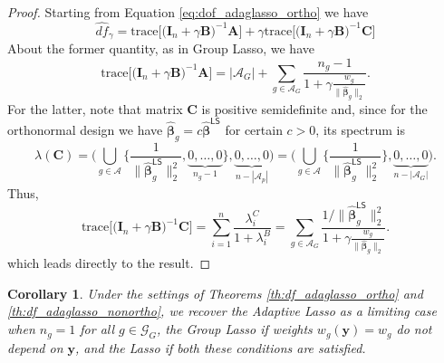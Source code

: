 \documentclass[a4paper, 12pt]{article}
\newcommand{\Aset}{\mathcal{A}}
\newcommand{\trace}{\mathrm{trace}}
\def\bbeta{\boldsymbol{\beta}}
\def\by{\boldsymbol{y}}
\def\bA{\mathbf{A}}
\def\bB{\mathbf{B}}
\def\bC{\mathbf{C}}
\def\bI{\mathbf{I}}
\def\by{\mathbf{y}}
\newtheorem{corollary}{Corollary}
\begin{document}
\begin{proof}
Starting from Equation \eqref{eq:dof_adaglasso_ortho} we have
\begin{equation*}
\widehat{df}_\gamma = \trace \big[ \big(\bI_n+\gamma \bB \big)^{-1} \bA \big] + \gamma \trace \big[\big(\bI_n+\gamma \bB \big)^{-1} \bC \big] 
\end{equation*}
About the former quantity, as in Group Lasso, we have
\begin{equation*}
\trace \big[ \big(\bI_n+\gamma \bB \big)^{-1} \bA \big] = |\Aset_G| + \sum_{g \in \Aset_G} \frac{n_g-1}{1+\gamma\frac{w_g}{\lVert \widehat{\bbeta}_g\rVert_2} }.
\end{equation*}
For the latter, note that matrix $\bC$ is positive semidefinite and, since for the orthonormal design we have $\widehat{\bbeta}_g = c \widehat{\bbeta}^\mathsf{LS}$ for certain $c>0$, its spectrum is 
\begin{equation*}
\lambda(\bC) = \bigg(\bigcup_{g \in \Aset} \bigg\{ \frac{1}{\lVert \widehat{\bbeta}_g^\mathsf{LS} \rVert_2^2}, \underbrace{0, \ldots, 0}_{n_g-1} \bigg\}, \underbrace{0, \ldots, 0 }_{n-|\Aset_p|}\bigg) = \bigg(\bigcup_{g \in \Aset} \bigg\{ \frac{1}{\lVert \widehat{\bbeta}_g^\mathsf{LS} \rVert_2^2}\bigg\}, \underbrace{0, \ldots, 0 }_{n-|\Aset_G|}\bigg).
\end{equation*}
Thus, 
\begin{equation*}
\trace \big[ \big(\bI_n+\gamma \bB \big)^{-1} \bC \big] = \sum_{i=1}^n \frac{\lambda_i^C}{1+\lambda_i^B}= \sum_{g \in \Aset_G} \frac{1/\lVert \widehat{\bbeta}_g^\mathsf{LS}\rVert_2^2}{1+\gamma\frac{w_g}{\lVert \widehat{\bbeta}_g\rVert_2} }.
\end{equation*}
which leads directly to the result.
\end{proof}
%
\begin{corollary}
\label{coro:special_cases_adaglasso}
Under the settings of Theorems \ref{th:df_adaglasso_ortho} and \ref{th:df_adaglasso_nonortho}, we recover the Adaptive Lasso as a limiting case when $n_g=1$ for all $g \in \mathcal{G}_G$, the Group Lasso if weights $w_g(\by) = w_g$ do not depend on $\by$, and the Lasso if both these conditions are satisfied.
\end{corollary}
\end{document}
